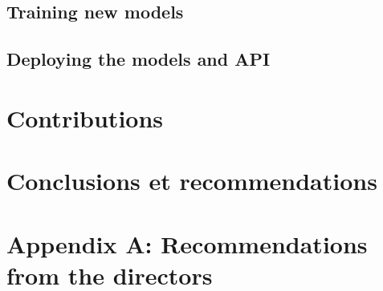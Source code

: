 \documentclass[11pt]{article}
\begin{document}
\subsection{Training new models}


\subsection{Deploying the models and API}

\cleardoublepage


\section{Contributions}
\cleardoublepage


\section{Conclusions et recommendations}

\cleardoublepage


\cleardoublepage




\cleardoublepage


\section*{Appendix A: Recommendations from the directors}

\cleardoublepage
\end{document}
